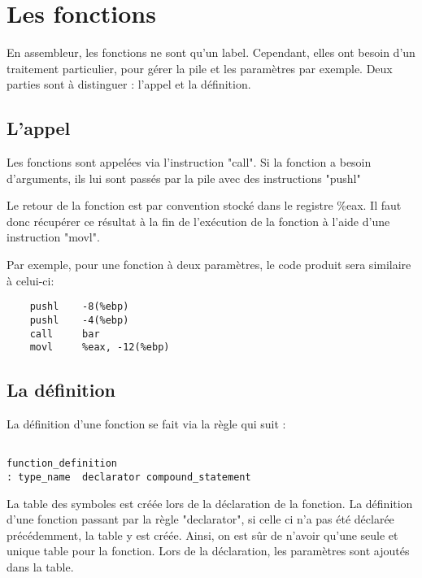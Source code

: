 \section{Les fonctions}

\vspace{0.5cm}
En assembleur, les fonctions ne sont qu'un label. Cependant, elles ont besoin d'un traitement particulier, pour gérer la pile et les paramètres par exemple.
Deux parties sont à distinguer : l'appel et la définition.

\subsection*{L'appel}

Les fonctions sont appelées via l'instruction "call".
Si la fonction a besoin d'arguments, ils lui sont passés par la pile avec des instructions "pushl"

Le retour de la fonction est par convention stocké dans le registre \%eax. Il faut donc récupérer ce résultat à la fin de l'exécution de la fonction à l'aide d'une instruction "movl".

\vspace{0.5cm}
Par exemple, pour une fonction à deux paramètres, le code produit sera similaire à celui-ci:

\begin{verbatim}
	pushl	 -8(%ebp)
	pushl	 -4(%ebp)
	call	 bar
	movl	 %eax, -12(%ebp) 
\end{verbatim}

\subsection*{La définition}

La définition d'une fonction se fait via la règle qui suit :

\begin{verbatim}
 
function_definition
: type_name  declarator compound_statement 

\end{verbatim}

La table des symboles est créée lors de la déclaration de la fonction. La définition d'une fonction passant par la règle "declarator", si celle ci n'a pas été déclarée précédemment, la table y est créée. Ainsi, on est sûr de n'avoir qu'une seule et unique table pour la fonction. Lors de la déclaration, les paramètres sont ajoutés dans la table.

